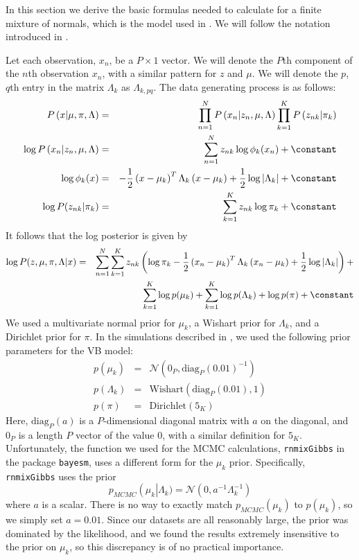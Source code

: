In this section we derive the basic formulas needed to calculate 
for a finite mixture of normals, which
is the model used in .  We will
follow the notation introduced in .

Let each observation, $x_{n}$, be a $P\times1$ vector. We will denote
the $P$th component of the $n$th observation $x_{n}$, with a
similar pattern for $z$ and $\mu$. We will denote the $p$, $q$th
entry in the matrix $\Lambda_{k}$ as $\Lambda_{k,pq}$. The data
generating process is as follows:
%
\begin{eqnarray*}
P\left(x | \mu, \pi, \Lambda \right) &=&
  \prod_{n=1}^N P\left(x_{n}|z_{n},\mu,\Lambda \right)
  \prod_{k=1}^{K} P\left(z_{nk}|\pi_{k} \right)\\
\log P\left(x_{n}|z_{n},\mu,\Lambda\right) & = &
    \sum_{n=1}^{N}z_{nk}\log\phi_{k}(x_{n}) + \constant\\
\log\phi_{k}(x) & = & -\frac{1}{2}\left(x - \mu_{k}\right)^{T} \Lambda_{k}\left(x-\mu_{k}\right) +
    \frac{1}{2}\log\left|\Lambda_{k}\right|+ \constant\\
\log P(z_{nk}|\pi_{k}) & = & \sum_{k=1}^{K}z_{nk}\log\pi_{k} + \constant
\end{eqnarray*}
%
It follows that the log posterior is given by
%
\begin{eqnarray*}
\log P(z,\mu,\pi,\Lambda | x) & = & \sum_{n=1}^{N}\sum_{k=1}^{K}z_{nk}\left(\log\pi_{k}-\frac{1}{2}\left(x_{n}-\mu_{k}\right)^{T}\Lambda_{k}\left(x_{n}-\mu_{k}\right)+\frac{1}{2}\log\left|\Lambda_{k}\right|\right) + \\
  &  & \sum_{k=1}^{K} \log p(\mu_{k}) + \sum_{k=1}^{K} \log p(\Lambda_{k}) +
        \log p(\pi) + \constant
\end{eqnarray*}
%
We used a multivariate normal prior for $\mu_{k}$, a Wishart prior for
$\Lambda_{k}$, and a Dirichlet prior for $\pi$.  In the simulations described
in , we used the following prior parameters
for the VB model:
%
\begin{eqnarray*}
  p(\mu_{k}) &=& \mathcal{N}\left(0_P, \textrm{diag}_P(0.01)^{-1}\right) \\
  p(\Lambda_{k}) &=& \textrm{Wishart}(\textrm{diag}_P(0.01), 1)\\
  p(\pi) &=& \textrm{Dirichlet}(5_K)
\end{eqnarray*}
%
Here, $\textrm{diag}_P(a)$ is a $P$-dimensional diagonal matrix with $a$ on the
diagonal, and $0_P$ is a length $P$ vector of the value $0$, with a similar
definition for $5_K$. Unfortunately, the function we used for the MCMC
calculations, \texttt{rnmixGibbs} in the package \texttt{bayesm}, uses a
different form for the $\mu_{k}$ prior. Specifically, \texttt{rnmixGibbs} uses
the prior
%
$$
  p_{MCMC}\left(\mu_{k} \right \vert \Lambda_{k}) =
    \mathcal{N}(0, a^{-1} \Lambda_{k}^{-1})
$$
%
where $a$ is a scalar.  There is no way to exactly match
$p_{MCMC}(\mu_k)$ to $p(\mu_k)$, so we simply set $a=0.01$.
Since our datasets are all reasonably large, the prior was dominated by the
likelihood, and we found the results extremely insensitive to the prior
on $\mu_{k}$, so this discrepancy is of no practical importance.

